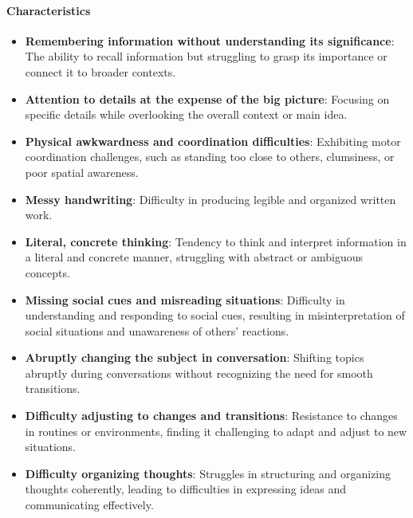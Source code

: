 \paragraph{Characteristics}
\begin{itemize}
    \item \textbf{Remembering information without understanding its significance}: The ability to recall information but struggling to grasp its importance or connect it to broader contexts.
    \item \textbf{Attention to details at the expense of the big picture}: Focusing on specific details while overlooking the overall context or main idea.
    \item \textbf{Physical awkwardness and coordination difficulties}: Exhibiting motor coordination challenges, such as standing too close to others, clumsiness, or poor spatial awareness.
    \item \textbf{Messy handwriting}: Difficulty in producing legible and organized written work.
    \item \textbf{Literal, concrete thinking}: Tendency to think and interpret information in a literal and concrete manner, struggling with abstract or ambiguous concepts.
    \item \textbf{Missing social cues and misreading situations}: Difficulty in understanding and responding to social cues, resulting in misinterpretation of social situations and unawareness of others' reactions.
    \item \textbf{Abruptly changing the subject in conversation}: Shifting topics abruptly during conversations without recognizing the need for smooth transitions.
    \item \textbf{Difficulty adjusting to changes and transitions}: Resistance to changes in routines or environments, finding it challenging to adapt and adjust to new situations.
    \item \textbf{Difficulty organizing thoughts}: Struggles in structuring and organizing thoughts coherently, leading to difficulties in expressing ideas and communicating effectively.
\end{itemize}

